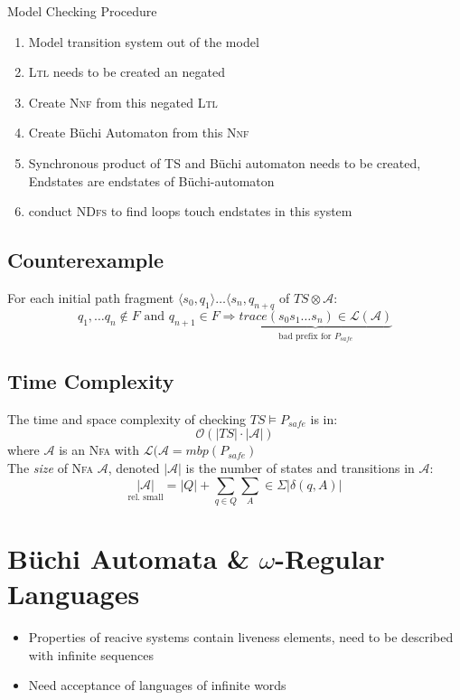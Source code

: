 \documentclass[a4paper, 10pt]{article}
\begin{document}
\begin{minipage}[t]{0.48\textwidth}
Model Checking Procedure
\begin{enumerate}
    \item Model transition system out of the model
    \item \textsc{Ltl} needs to be created an negated
    \item Create \textsc{Nnf} from this negated \textsc{Ltl}
    \item Create Büchi Automaton from this \textsc{Nnf}
    \item Synchronous product of TS and Büchi automaton needs to be created, Endstates are endstates of Büchi-automaton
    \item conduct \textsc{NDfs} to find loops touch endstates in this system
\end{enumerate}
\end{minipage}


\subsection*{Counterexample}
\begin{shaded}
    For each initial path fragment $\langle s_0,q_1\rangle\dots\langle s_n,q_{n+q}$ of $TS\otimes\mathcal{A}:$
    \[
    q_1,\dots q_n\not\in F \textrm{ and } q_{n+1}\in F \Rightarrow \underset{\textrm{bad prefix for } P_{safe}}{\underbrace{trace(s_0s_1\dots s_n)\in\mathcal{L(\mathcal{A})}}}
    \]
\end{shaded}


\subsection*{Time Complexity}
\begin{shaded}
    The time and space complexity of checking $TS\models P_{safe}$ is in:
    \[ \mathcal{O} (|TS|\cdot|\mathcal{A}|) \]
    where $\mathcal{A}$ is an \textsc{Nfa} with $\mathcal{L}(\mathcal{A}=mbp(P_{safe})$
\\ The \emph{size} of \textsc{Nfa} $\mathcal{A}$, denoted $|\mathcal{A}|$ is the number of states and transitions in $\mathcal{A}:$
\[ \underset{\textrm{rel. small}}{|\mathcal{A}|} = |Q| + \sum_{q\in Q} \sum_{A}\in\Sigma |\delta(q,A)| \]
\end{shaded}

\section*{Büchi Automata \& $\omega$-Regular Languages}
\begin{itemize}
    \item Properties of reacive systems contain liveness elements, need to be described with infinite sequences
    \item Need acceptance of languages of infinite words
\end{itemize}
\end{document}
